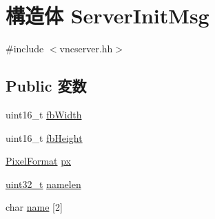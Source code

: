 \hypertarget{structVncServer_1_1ServerInitMsg}{
\section{構造体 ServerInitMsg}
\label{structVncServer_1_1ServerInitMsg}
}


{\ttfamily \#include $<$vncserver.hh$>$}\subsection*{Public 変数}
\begin{DoxyCompactItemize}
\item 
uint16\_\-t \hyperlink{structVncServer_1_1ServerInitMsg_acddb57186e2184c61efc8f0b3ff8cc0d}{fbWidth}
\item 
uint16\_\-t \hyperlink{structVncServer_1_1ServerInitMsg_ab6718ea70335e6a9b1bbe1d3ca47dfc9}{fbHeight}
\item 
\hyperlink{structVncInput_1_1PixelFormat}{PixelFormat} \hyperlink{structVncServer_1_1ServerInitMsg_a07ef974d3a4dd48ea4b0b1decc3732e2}{px}
\item 
\hyperlink{Type_8hh_a435d1572bf3f880d55459d9805097f62}{uint32\_\-t} \hyperlink{structVncServer_1_1ServerInitMsg_a60a1b79d3f807e575fa2073abc688d7f}{namelen}
\item 
char \hyperlink{structVncServer_1_1ServerInitMsg_ab2726dd451e7676f553e96d5620bdfe3}{name} \mbox{[}2\mbox{]}
\end{DoxyCompactItemize}


